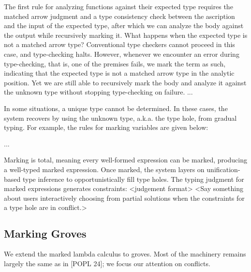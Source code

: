 \begin{mathpar}
\label{inf:marking-rules}

\end{mathpar}

The first rule for analyzing functions against their expected type requires the matched arrow judgment and a type consistency check between the ascription and the input of the expected type, after which we can analyze the body against the output while recursively marking it. What happens when the expected type is not a matched arrow type? Conventional type checkers cannot proceed in this case, and type-checking halts. However, whenever we encounter an error during type-checking, that is, one of the premises fails, we mark the term as such, indicating that the expected type is not a matched arrow type in the analytic position. Yet we are still able to recursively mark the body and analyze it against the unknown type without stopping type-checking on failure.
...

In some situations, a unique type cannot be determined. In these cases, the system recovers by using the unknown type, a.k.a. the type hole, from gradual typing. For example, the rules for marking variables are given below:

...

Marking is total, meaning every well-formed expression can be marked, producing a well-typed marked expression. Once marked, the system layers on unification-based type inference to opportunistically fill type holes. The typing judgment for marked expressions generates constraints: <judgement format>
<Say something about users interactively choosing from partial solutions when the constraints for a type hole are in conflict.>

\subsection{Marking Groves}
\label{sub:marking-groves}
We extend the marked lambda calculus to groves. Most of the machinery remains largely the same as in [POPL 24]; we focus our attention on conflicts.

